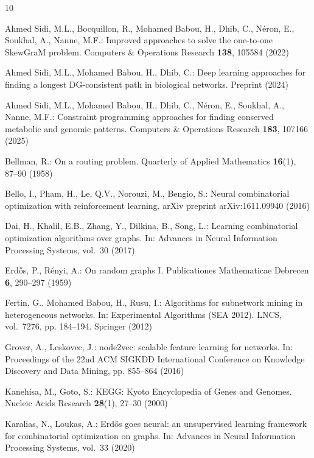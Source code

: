 \documentclass{llncs}
\begin{document}

\begin{thebibliography}{10}

Ahmed Sidi, M.L., Bocquillon, R., Mohamed Babou, H., Dhib, C., Néron, E., Soukhal, A., Nanne, M.F.: Improved approaches to solve the one-to-one SkewGraM problem. Computers \& Operations Research \textbf{138}, 105584 (2022)

Ahmed Sidi, M.L., Mohamed Babou, H., Dhib, C.: Deep learning approaches for finding a longest DG-consistent path in biological networks. Preprint (2024)

Ahmed Sidi, M.L., Mohamed Babou, H., Dhib, C., Néron, E., Soukhal, A., Nanne, M.F.: Constraint programming approaches for finding conserved metabolic and genomic patterns. Computers \& Operations Research \textbf{183}, 107166 (2025)

Bellman, R.: On a routing problem. Quarterly of Applied Mathematics \textbf{16}(1), 87--90 (1958)

Bello, I., Pham, H., Le, Q.V., Norouzi, M., Bengio, S.: Neural combinatorial optimization with reinforcement learning. arXiv preprint arXiv:1611.09940 (2016)

Dai, H., Khalil, E.B., Zhang, Y., Dilkina, B., Song, L.: Learning combinatorial optimization algorithms over graphs. In: Advances in Neural Information Processing Systems, vol.~30 (2017)

Erd\H{o}s, P., Rényi, A.: On random graphs I. Publicationes Mathematicae Debrecen \textbf{6}, 290--297 (1959)

Fertin, G., Mohamed Babou, H., Rusu, I.: Algorithms for subnetwork mining in heterogeneous networks. In: Experimental Algorithms (SEA 2012). LNCS, vol.~7276, pp. 184--194. Springer (2012)

Grover, A., Leskovec, J.: node2vec: scalable feature learning for networks. In: Proceedings of the 22nd ACM SIGKDD International Conference on Knowledge Discovery and Data Mining, pp. 855--864 (2016)

Kanehisa, M., Goto, S.: KEGG: Kyoto Encyclopedia of Genes and Genomes. Nucleic Acids Research \textbf{28}(1), 27--30 (2000)

Karalias, N., Loukas, A.: Erd\H{o}s goes neural: an unsupervised learning framework for combinatorial optimization on graphs. In: Advances in Neural Information Processing Systems, vol.~33 (2020)


\end{thebibliography}
\end{document}
